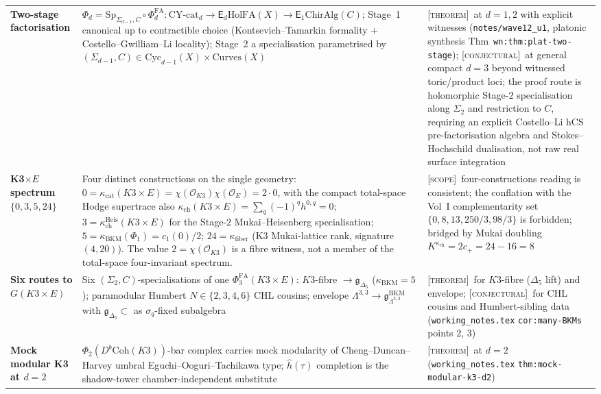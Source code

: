 \documentclass[11pt]{article}
\theoremstyle{definition}
\theoremstyle{remark}
\providecommand{\cO}{\mathcal{O}}
\providecommand{\fg}{\mathfrak{g}}
\providecommand{\Coh}{\mathrm{Coh}}
\providecommand{\ChirAlg}{\mathrm{ChirAlg}}
\providecommand{\CYcat}{\mathrm{CY}\text{-}\mathrm{cat}}
\providecommand{\HolFA}{\mathrm{HolFA}}
\providecommand{\Sp}{\mathrm{Sp}}
\providecommand{\Phifa}{\Phi^{\mathrm{FA}}}
\providecommand{\Eone}{\mathsf{E}_1}
\providecommand{\Ed}{\mathsf{E}_d}
\providecommand{\kch}{\kappa_{\mathrm{ch}}}
\providecommand{\kcat}{\kappa_{\mathrm{cat}}}
\providecommand{\kBKM}{\kappa_{\mathrm{BKM}}}
\providecommand{\kfib}{\kappa_{\mathrm{fiber}}}
\providecommand{\ClaimStatusTheorem}{\textsc{[theorem]}}
\providecommand{\ClaimStatusConjectured}{\textsc{[conjectural]}}
\providecommand{\ClaimStatusScope}{\textsc{[scope]}}
\begin{document}
\begin{longtable}{@{}p{3.5cm}p{6.0cm}p{5.5cm}@{}}
\textbf{Two-stage factorisation}
& $\Phi_d = \Sp_{\Sigma_{d-1},C}\circ\Phifa_d\colon\CYcat_d\to
\Ed\HolFA(X)\to\Eone\ChirAlg(C)$; Stage~1 canonical up to
contractible choice (Kontsevich--Tamarkin formality +
Costello--Gwilliam--Li locality); Stage~2 a specialisation
parametrised by $(\Sigma_{d-1},C)\in\mathrm{Cyc}_{d-1}(X)\times
\mathrm{Curves}(X)$
& \ClaimStatusTheorem\ at $d=1,2$ with explicit witnesses
(\texttt{notes/wave12\_u1}, platonic synthesis
Thm~\texttt{wn:thm:plat-two-stage});
\ClaimStatusConjectured\ at general compact $d=3$ beyond witnessed
toric/product loci; the proof route is holomorphic Stage-$2$
specialisation along $\Sigma_2$ and restriction to $C$, requiring an
explicit Costello--Li hCS pre-factorisation algebra and
Stokes--Hochschild dualisation, not raw real surface integration
\\[0.3ex]

\textbf{K3$\times E$ spectrum $\{0,3,5,24\}$}
& Four distinct constructions on the single geometry:
$0 = \kcat(K3\times E)=\chi(\cO_{K3})\chi(\cO_E)=2\cdot0$,
with the compact total-space Hodge supertrace also
$\kch(K3\times E)=\sum_q(-1)^qh^{0,q}=0$;
$3 = \kch^{\mathrm{Heis}}(K3\times E)$ for the Stage-$2$
Mukai--Heisenberg specialisation;
$5 = \kBKM(\Phi_1) = c_1(0)/2$;
$24 = \kfib$ (K3 Mukai-lattice rank, signature $(4,20)$).
The value $2=\chi(\cO_{K3})$ is a fibre witness, not a member of the
total-space four-invariant spectrum.
& \ClaimStatusScope\ four-constructions reading is consistent; the
conflation with the Vol~I complementarity set
$\{0,8,13,250/3,98/3\}$ is forbidden; bridged by Mukai doubling
$K^{\kch} = 2c_+ = 24 - 16 = 8$
\\[0.3ex]

\textbf{Six routes to $G(K3\times E)$}
& Six $(\Sigma_2,C)$-specialisations of one
$\Phifa_3(K3\times E)$: $K3$-fibre $\to\fg_{\Delta_5}$
($\kBKM = 5$); paramodular Humbert $N\in\{2,3,4,6\}$ CHL cousins;
envelope $\Lambda^{3,3}\to\fg^{\mathrm{BKM}}_{\Lambda^{3,3}}$
with $\fg_{\Delta_5}\subset$ as $\sigma_q$-fixed subalgebra
& \ClaimStatusTheorem\ for $K3$-fibre ($\Delta_5$ lift) and
envelope; \ClaimStatusConjectured\ for CHL cousins and
Humbert-sibling data (\texttt{working\_notes.tex}
\texttt{cor:many-BKMs} points 2, 3)
\\[0.3ex]

\textbf{Mock modular K3 at $d=2$}
& $\Phi_2(D^b\Coh(K3))$-bar complex carries mock modularity
of Cheng--Duncan--Harvey umbral Eguchi--Ooguri--Tachikawa type;
$\widehat{h}(\tau)$ completion is the shadow-tower
chamber-independent substitute
& \ClaimStatusTheorem\ at $d=2$ (\texttt{working\_notes.tex}
\texttt{thm:mock-modular-k3-d2})
\\[0.3ex]


\end{longtable}
\end{document}
